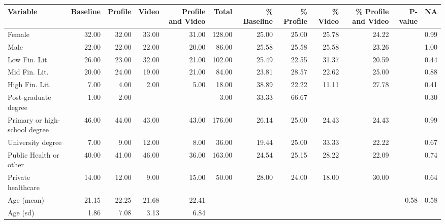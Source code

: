 \begin{tabular}{lrrrrrrrrrrr}
  \hline
Variable & Baseline & Profile & Video & Profile and Video & Total & \% Baseline & \% Profile & \% Video & \% Profile and Video & P-value & NA \\ 
  \hline
Female & 32.00 & 32.00 & 33.00 & 31.00 & 128.00 & 25.00 & 25.00 & 25.78 & 24.22 &  & 0.99 \\ 
  Male & 22.00 & 22.00 & 22.00 & 20.00 & 86.00 & 25.58 & 25.58 & 25.58 & 23.26 &  & 1.00 \\ 
  Low Fin. Lit. & 26.00 & 23.00 & 32.00 & 21.00 & 102.00 & 25.49 & 22.55 & 31.37 & 20.59 &  & 0.44 \\ 
  Mid Fin. Lit. & 20.00 & 24.00 & 19.00 & 21.00 & 84.00 & 23.81 & 28.57 & 22.62 & 25.00 &  & 0.88 \\ 
  High Fin. Lit. & 7.00 & 4.00 & 2.00 & 5.00 & 18.00 & 38.89 & 22.22 & 11.11 & 27.78 &  & 0.41 \\ 
  Post-graduate degree & 1.00 & 2.00 &  &  & 3.00 & 33.33 & 66.67 &  &  &  & 0.30 \\ 
  Primary or high-school degree & 46.00 & 44.00 & 43.00 & 43.00 & 176.00 & 26.14 & 25.00 & 24.43 & 24.43 &  & 0.99 \\ 
  University degree & 7.00 & 9.00 & 12.00 & 8.00 & 36.00 & 19.44 & 25.00 & 33.33 & 22.22 &  & 0.67 \\ 
  Public Health or other & 40.00 & 41.00 & 46.00 & 36.00 & 163.00 & 24.54 & 25.15 & 28.22 & 22.09 &  & 0.74 \\ 
  Private healthcare & 14.00 & 12.00 & 9.00 & 15.00 & 50.00 & 28.00 & 24.00 & 18.00 & 30.00 &  & 0.64 \\ 
  Age (mean) & 21.15 & 22.25 & 21.68 & 22.41 &  &  &  &  &  & 0.58 & 0.58 \\ 
  Age (sd) & 1.86 & 7.08 & 3.13 & 6.84 &  &  &  &  &  &  &  \\ 
   \hline
\end{tabular}
